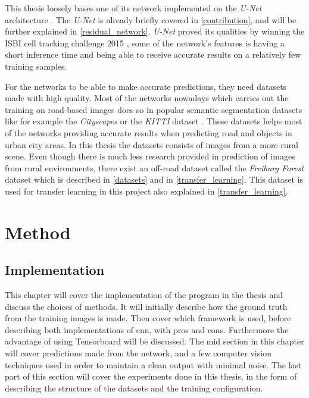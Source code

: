\documentclass[USenglish]{ifimaster}  %
\begin{document}
This thesis loosely bases one of its network implemented on the \textit{U-Net} architecture \cite{website:u_net_article}. The \textit{U-Net} is already briefly covered in \cref{contribution}, and will be further explained in \cref{residual_network}. \textit{U-Net} proved its qualities by winning the ISBI cell tracking challenge 2015 \cite{website:u_net_won}, some of the network's features is having a short inference time and being able to receive accurate results on a relatively few training samples. 

For the networks to be able to make accurate predictions, they need datasets made with high quality. Most of the networks nowadays which carries out the training on road-based images does so in popular semantic segmentation datasets like for example the \textit{Cityscapes} \cite{website:cityscapes_web} or the \textit{KITTI} dataset \cite{website:kitti}. These datasets helps most of the networks providing accurate results when predicting road and objects in urban city areas. In this thesis the datasets consists of images from a more rural scene. Even though there is much less research provided in prediction of images from rural environments, there exist an off-road dataset called the \textit{Freiburg Forest} dataset which is described in \cref{datasets} and in \cref{transfer_learning}. This dataset is used for transfer learning in this project also explained in \cref{transfer_learning}.   

\chapter{Method}\label{method}
\section{Implementation}
This chapter will cover the implementation of the program in the thesis and discuss the choices of methods. It will initially describe how the ground truth from the training images is made. Then cover which framework is used, before describing both implementations of \ac{cnn}, with pros and cons. Furthermore the advantage of using Tensorboard will be discussed. The mid section in this chapter will cover predictions made from the network, and a few computer vision techniques used in order to maintain a clean output with minimal noise. The last part of this section will cover the experiments done in this thesis, in the form of describing the structure of the datasets and the training configuration.
\end{document}
